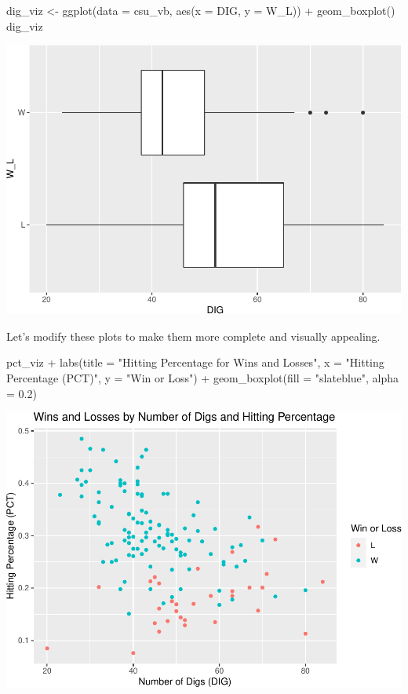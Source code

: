 \documentclass[
  11pt,
]{book}
\newenvironment{Shaded}{\begin{snugshade}}{\end{snugshade}}
\newcommand{\AttributeTok}[1]{\textcolor[rgb]{0.77,0.63,0.00}{#1}}
\newcommand{\FloatTok}[1]{\textcolor[rgb]{0.00,0.00,0.81}{#1}}
\newcommand{\FunctionTok}[1]{\textcolor[rgb]{0.00,0.00,0.00}{#1}}
\newcommand{\NormalTok}[1]{#1}
\newcommand{\OtherTok}[1]{\textcolor[rgb]{0.56,0.35,0.01}{#1}}
\newcommand{\SpecialCharTok}[1]{\textcolor[rgb]{0.00,0.00,0.00}{#1}}
\newcommand{\StringTok}[1]{\textcolor[rgb]{0.31,0.60,0.02}{#1}}
\theoremstyle{definition}
\theoremstyle{definition}
\theoremstyle{definition}
\theoremstyle{definition}
\theoremstyle{remark}
\begin{document}
\begin{Shaded}
\begin{Highlighting}[]
\NormalTok{dig\_viz }\OtherTok{\textless{}{-}} \FunctionTok{ggplot}\NormalTok{(}\AttributeTok{data =}\NormalTok{ csu\_vb, }\FunctionTok{aes}\NormalTok{(}\AttributeTok{x =}\NormalTok{ DIG, }\AttributeTok{y =}\NormalTok{ W\_L)) }\SpecialCharTok{+} \FunctionTok{geom\_boxplot}\NormalTok{()}
\NormalTok{dig\_viz}
\end{Highlighting}
\end{Shaded}

\includegraphics{series_files/figure-latex/unnamed-chunk-33-2.pdf}

Let's modify these plots to make them more complete and visually appealing.

\begin{Shaded}
\begin{Highlighting}[]
\NormalTok{pct\_viz }\SpecialCharTok{+} \FunctionTok{labs}\NormalTok{(}\AttributeTok{title =} \StringTok{"Hitting Percentage for Wins and Losses"}\NormalTok{, }\AttributeTok{x =} \StringTok{"Hitting Percentage (PCT)"}\NormalTok{,}
    \AttributeTok{y =} \StringTok{"Win or Loss"}\NormalTok{) }\SpecialCharTok{+} \FunctionTok{geom\_boxplot}\NormalTok{(}\AttributeTok{fill =} \StringTok{"slateblue"}\NormalTok{, }\AttributeTok{alpha =} \FloatTok{0.2}\NormalTok{)}
\end{Highlighting}
\end{Shaded}

\includegraphics{series_files/figure-latex/unnamed-chunk-34-1.pdf}
\end{document}
